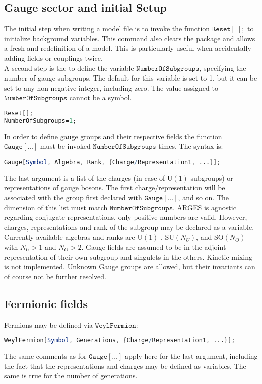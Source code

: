 \documentclass{scrartcl}
\begin{document}
\subsection{Gauge sector and initial Setup}
The initial step when writing a model file is to invoke the function $\mathtt{Reset[\;];}$ to initialize background variables. This command also clears the package and allows a fresh and redefinition of a model. This is particularly useful when accidentally adding fields or couplings twice. \\
A second step is the to define the variable $\mathtt{NumberOfSubgroups}$, specifying the number of gauge subgroups. The default for this variable is set to 1, but it can be set to any non-negative integer, including zero. The value assigned to $\mathtt{NumberOfSubgroups}$ cannot be a symbol.
\vspace{1em}
\begin{lstlisting}[language=mathematica,mathescape,columns=flexible,backgroundcolor=\color{light-gray}]
Reset[];
NumberOfSubgroups=1;
\end{lstlisting}
\vspace{1em}
In order to define gauge groups and their respective fields the function $\mathtt{Gauge[\dots]}$ must be invoked $\mathtt{NumberOfSubgroups}$ times. The syntax is:
\begin{lstlisting}[language=mathematica,mathescape,columns=flexible,backgroundcolor=\color{light-gray}]
Gauge[Symbol, Algebra, Rank, {Charge/Representation1, ...}];
\end{lstlisting}
The last argument is a list of the charges (in case of $\mathrm{U}(1)$ subgroups) or representations of gauge bosons. The first charge/representation will be associated with the group first declared with $\mathtt{Gauge[\dots]}$, and so on. The dimension of this list must match $\mathtt{NumberOfSubgroups}$. ARGES is agnostic regarding conjugate representations, only positive numbers are valid. However, charges, representations and rank of the subgroup may be declared as a variable. \newline Currently available algebras and ranks are $\mathrm{U}(1)$ , $\mathrm{SU}(N_U)$, and $\mathrm{SO}(N_O)$ with $N_U > 1$ and $N_O > 2$. Gauge fields are assumed to be in the adjoint representation of their own subgroup and singulets in the others. Kinetic mixing is not implemented. \newline Unknown Gauge groups are allowed, but their invariants can of course not be further resolved.
\FloatBarrier
\subsection{Fermionic fields}
Fermions may be defined via $\mathtt{WeylFermion}$:
\begin{lstlisting}[language=mathematica,mathescape,columns=flexible,backgroundcolor=\color{light-gray}]
WeylFermion[Symbol, Generations, {Charge/Representation1, ...}];
\end{lstlisting}
The same comments as for $\mathtt{Gauge[\dots]}$ apply here for the last argument, including the fact that the representations and charges may be defined as variables. The same is true for the number of generations.
\FloatBarrier
\end{document}
